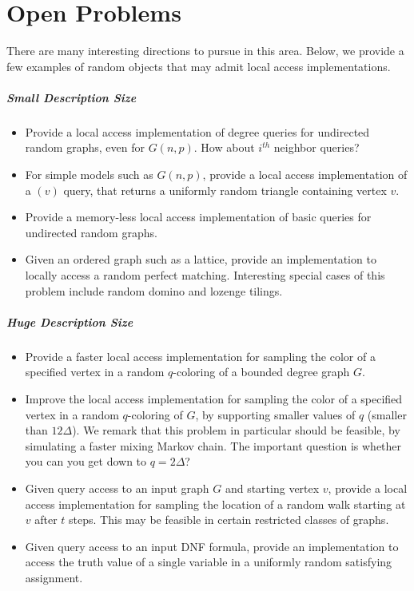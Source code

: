 \section{Open Problems}%
\label{sec:open_problems}
There are many interesting directions to pursue in this area.
Below, we provide a few examples of random objects that may admit local access implementations.

\subparagraph*{Small Description Size}
\label{par:small_description_size}
\begin{itemize}
    \item Provide a local access implementation of degree queries for undirected random graphs, even for $G(n,p)$.
    How about $i^{th}$ neighbor queries?
    \item For simple models such as $G(n,p)$, provide a local access implementation of a $(v)$ query,
    that returns a uniformly random triangle containing vertex $v$.
    \item Provide a memory-less local access implementation of basic queries for undirected random graphs.
    \item Given an ordered graph such as a lattice, provide an implementation to locally access a random perfect matching.
    Interesting special cases of this problem include random domino and lozenge tilings.
\end{itemize}

\subparagraph*{Huge Description Size}
\label{par:huge_description_size}
\begin{itemize}
    \item Provide a faster local access implementation for sampling the color of a specified vertex
    in a random $q$-coloring of a bounded degree graph $G$.
    \item Improve the local access implementation for sampling the color of a specified vertex in a random $q$-coloring of $G$,
    by supporting smaller values of $q$ (smaller than $12\Delta$).
    We remark that this problem in particular should be feasible, by simulating a faster mixing Markov chain.
    The important question is whether you can you get down to $q = 2\Delta$?
    \item Given query access to an input graph $G$ and starting vertex $v$,
    provide a local access implementation for sampling the location of a random walk starting at $v$ after $t$ steps.
    This may be feasible in certain restricted classes of graphs.
    \item Given query access to an input DNF formula, provide an implementation to access the truth value of a single variable in a uniformly random satisfying assignment.
\end{itemize}
